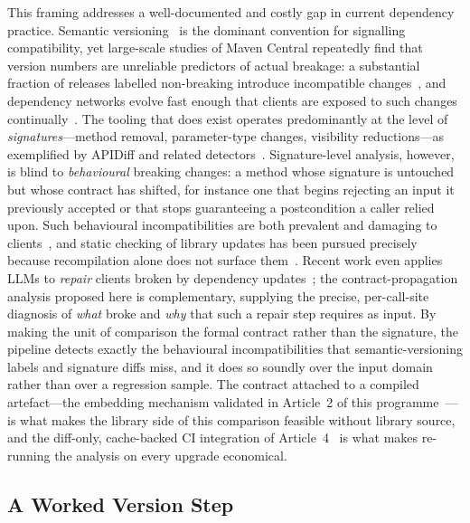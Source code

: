 This framing addresses a well-documented and costly gap in current dependency
practice. Semantic versioning~\cite{preston2013semver} is the dominant
convention for signalling compatibility, yet large-scale studies of Maven
Central repeatedly find that version numbers are unreliable predictors of actual
breakage: a substantial fraction of releases labelled non-breaking introduce
incompatible changes~\cite{raemaekers2017semver,ochoa2022breaking}, and
dependency networks evolve fast enough that clients are exposed to such changes
continually~\cite{decan2019empirical}. The tooling that does exist operates
predominantly at the level of \emph{signatures}---method removal, parameter-type
changes, visibility reductions---as exemplified by APIDiff and related
detectors~\cite{brito2018apidiff,jezek2017magic}. Signature-level analysis,
however, is blind to \emph{behavioural} breaking changes: a method whose
signature is untouched but whose contract has shifted, for instance one that
begins rejecting an input it previously accepted or that stops guaranteeing a
postcondition a caller relied upon. Such behavioural incompatibilities are both
prevalent and damaging to clients~\cite{mostafa2017behavioral,jayasuriya2024understanding},
and static checking of library updates has been pursued precisely because
recompilation alone does not surface them~\cite{foo2018efficient}. Recent work
even applies LLMs to \emph{repair} clients broken by dependency
updates~\cite{islam2025byam}; the contract-propagation analysis proposed here is
complementary, supplying the precise, per-call-site diagnosis of \emph{what}
broke and \emph{why} that such a repair step requires as input. By making the
unit of comparison the formal contract rather than the signature, the pipeline
detects exactly the behavioural incompatibilities that semantic-versioning labels
and signature diffs miss, and it does so soundly over the input domain rather
than over a regression sample. The contract attached to a compiled
artefact---the embedding mechanism validated in Article~2 of this
programme~\cite{edmonds_article2}---is what makes the library side of this
comparison feasible without library source, and the diff-only, cache-backed CI
integration of Article~4~\cite{edmonds_article4} is what makes re-running the
analysis on every upgrade economical.

\subsection{A Worked Version Step}\label{subsec:worked}

